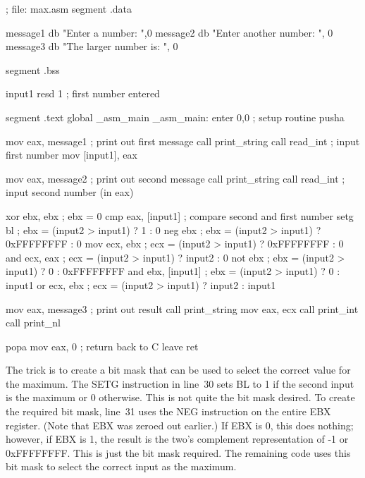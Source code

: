 \begin{AsmCodeListing}
; file: max.asm
segment .data

message1 db "Enter a number: ",0
message2 db "Enter another number: ", 0
message3 db "The larger number is: ", 0

segment .bss

input1  resd    1        ; first number entered

segment .text
        global  _asm_main
_asm_main:
        enter   0,0               ; setup routine
        pusha

        mov     eax, message1     ; print out first message
        call    print_string
        call    read_int          ; input first number
        mov     [input1], eax

        mov     eax, message2     ; print out second message
        call    print_string
        call    read_int          ; input second number (in eax)

        xor     ebx, ebx          ; ebx = 0
        cmp     eax, [input1]     ; compare second and first number
        setg    bl                ; ebx = (input2 > input1) ?          1 : 0
        neg     ebx               ; ebx = (input2 > input1) ? 0xFFFFFFFF : 0
        mov     ecx, ebx          ; ecx = (input2 > input1) ? 0xFFFFFFFF : 0
        and     ecx, eax          ; ecx = (input2 > input1) ?     input2 : 0
        not     ebx               ; ebx = (input2 > input1) ?          0 : 0xFFFFFFFF
        and     ebx, [input1]     ; ebx = (input2 > input1) ?          0 : input1
        or      ecx, ebx          ; ecx = (input2 > input1) ?     input2 : input1

        mov     eax, message3     ; print out result
        call    print_string
        mov     eax, ecx
        call    print_int
        call    print_nl

        popa
        mov     eax, 0            ; return back to C
        leave                     
        ret
\end{AsmCodeListing}

The trick is to create a bit mask that can be used to select the
correct value for the maximum. The {\code SETG}
instruction in line~30 sets BL to 1 if the second input is the maximum
or 0 otherwise. This is not quite the bit mask desired. To create the
required bit mask, line~31 uses the {\code NEG} instruction
on the entire EBX register. (Note that EBX was zeroed out earlier.)
If EBX is 0, this does nothing; however, if EBX is 1, the result is
the two's complement representation of -1 or 0xFFFFFFFF. This is just
the bit mask required. The remaining code uses this bit mask to select
the correct input as the maximum.

